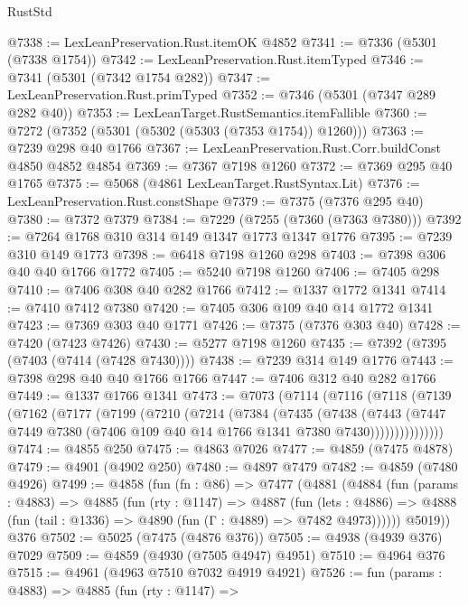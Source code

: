 \begin{lexlean}{RustStd}
\begin{coremodule}
@7338 := LexLeanPreservation.Rust.itemOK @4852
@7341 := @7336 (@5301 (@7338 @1754))
@7342 := LexLeanPreservation.Rust.itemTyped
@7346 := @7341 (@5301 (@7342 @1754 @282))
@7347 := LexLeanPreservation.Rust.primTyped
@7352 := @7346 (@5301 (@7347 @289 @282 @40))
@7353 := LexLeanTarget.RustSemantics.itemFallible
@7360 := @7272 (@7352 (@5301 (@5302 (@5303 (@7353 @1754)) @1260)))
@7363 := @7239 @298 @40 @1766
@7367 := LexLeanPreservation.Rust.Corr.buildConst @4850 @4852 @4854
@7369 := @7367 @7198 @1260
@7372 := @7369 @295 @40 @1765
@7375 := @5068 (@4861 LexLeanTarget.RustSyntax.Lit)
@7376 := LexLeanPreservation.Rust.constShape
@7379 := @7375 (@7376 @295 @40)
@7380 := @7372 @7379
@7384 := @7229 (@7255 (@7360 (@7363 @7380)))
@7392 := @7264 @1768 @310 @314 @149 @1347 @1773 @1347 @1776
@7395 := @7239 @310 @149 @1773
@7398 := @6418 @7198 @1260 @298
@7403 := @7398 @306 @40 @40 @1766 @1772
@7405 := @5240 @7198 @1260
@7406 := @7405 @298
@7410 := @7406 @308 @40 @282 @1766
@7412 := @1337 @1772 @1341
@7414 := @7410 @7412 @7380
@7420 := @7405 @306 @109 @40 @14 @1772 @1341
@7423 := @7369 @303 @40 @1771
@7426 := @7375 (@7376 @303 @40)
@7428 := @7420 (@7423 @7426)
@7430 := @5277 @7198 @1260
@7435 := @7392 (@7395 (@7403 (@7414 (@7428 @7430))))
@7438 := @7239 @314 @149 @1776
@7443 := @7398 @298 @40 @40 @1766 @1766
@7447 := @7406 @312 @40 @282 @1766
@7449 := @1337 @1766 @1341
@7473 := @7073
    (@7114
      (@7116
        (@7118
          (@7139
            (@7162
              (@7177
                (@7199
                  (@7210
                    (@7214
                      (@7384
                        (@7435
                          (@7438
                            (@7443
                              (@7447
                                @7449
                                @7380
                                (@7406 @109 @40 @14 @1766 @1341 @7380 @7430)))))))))))))))
@7474 := @4855 @250
@7475 := @4863 @7026
@7477 := @4859 (@7475 @4878)
@7479 := @4901 (@4902 @250)
@7480 := @4897 @7479
@7482 := @4859 (@7480 @4926)
@7499 := @4858
    (fun (fn : @86) =>
    @7477
      (@4881
        (@4884
          (fun (params : @4883) =>
          @4885
            (fun (rty : @1147) =>
            @4887
              (fun (lets : @4886) =>
              @4888 (fun (tail : @1336) => @4890 (fun (Γ : @4889) => @7482 @4973))))))
        @5019))
    @376
@7502 := @5025 (@7475 (@4876 @376))
@7505 := @4938 (@4939 @376) @7029
@7509 := @4859 (@4930 (@7505 @4947) @4951)
@7510 := @4964 @376
@7515 := @4961 (@4963 @7510 @7032 @4919 @4921)
@7526 := fun (params : @4883) =>
  @4885
    (fun (rty : @1147) =>

\end{coremodule}
\end{lexlean}
